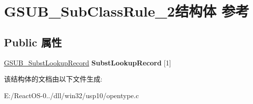 \hypertarget{struct_g_s_u_b___sub_class_rule__2}{}\section{G\+S\+U\+B\+\_\+\+Sub\+Class\+Rule\+\_\+2结构体 参考}
\label{struct_g_s_u_b___sub_class_rule__2}
\subsection*{Public 属性}
\begin{DoxyCompactItemize}
\item 
\mbox{\label{struct_g_s_u_b___sub_class_rule__2_a05ac7b0db5210ef94309c7c637a30855}} 
\hyperlink{struct_g_s_u_b___subst_lookup_record}{G\+S\+U\+B\+\_\+\+Subst\+Lookup\+Record} {\bfseries Subst\+Lookup\+Record} \mbox{[}1\mbox{]}
\end{DoxyCompactItemize}


该结构体的文档由以下文件生成\+:\begin{DoxyCompactItemize}
\item 
E\+:/\+React\+O\+S-\/0../dll/win32/usp10/opentype.\+c\end{DoxyCompactItemize}
